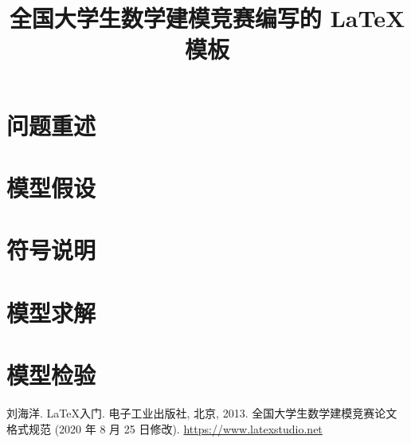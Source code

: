 \documentclass[withoutpreface,bwprint]{cumcmthesis} %
\title{全国大学生数学建模竞赛编写的 \LaTeX{} 模板}
\begin{document}
    \maketitle
    \begin{abstract}

    \end{abstract}

    \section{问题重述}
    \section{模型假设}
    \section{符号说明}
    \section{模型求解}
    \section{模型检验}

    \begin{thebibliography}{9}%
        刘海洋.
        \newblock \LaTeX {}入门\allowbreak[J].
        \newblock 电子工业出版社, 北京, 2013.
        全国大学生数学建模竞赛论文格式规范 (2020 年 8 月 25 日修改).
         \url{https://www.latexstudio.net}
    \end{thebibliography}

    \newpage
    \begin{appendices}
    \end{appendices}
\end{document}

